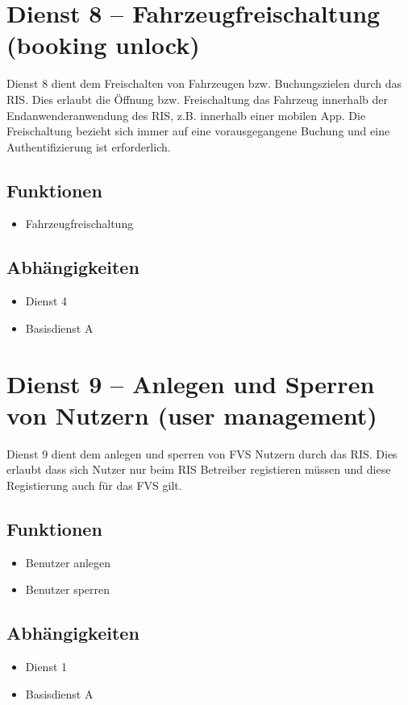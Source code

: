 \section{Dienst 8 -- Fahrzeugfreischaltung (booking unlock)}
Dienst 8 dient dem Freischalten von Fahrzeugen bzw. Buchungszielen durch das RIS. Dies erlaubt die Öffnung bzw. Freischaltung das Fahrzeug innerhalb der Endanwenderanwendung des RIS, z.B. innerhalb einer mobilen App. Die Freischaltung bezieht sich immer auf eine vorausgegangene Buchung und eine Authentifizierung ist erforderlich.

\subsection*{Funktionen}
\begin{itemize}
\item Fahrzeugfreischaltung
\end{itemize}

\subsection*{Abhängigkeiten}
\begin{itemize}
\item Dienst 4
\item Basisdienst A
\end{itemize}

\section{Dienst 9 -- Anlegen und Sperren von Nutzern (user management)}
Dienst 9 dient dem anlegen und sperren von FVS Nutzern durch das RIS. Dies erlaubt dass sich Nutzer nur beim RIS Betreiber registieren müssen und diese Registierung auch für das FVS gilt.

\subsection*{Funktionen}
\begin{itemize}
\item Benutzer anlegen
\item Benutzer sperren
\end{itemize}

\subsection*{Abhängigkeiten}
\begin{itemize}
\item Dienst 1
\item Basisdienst A
\end{itemize}
